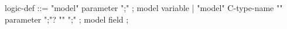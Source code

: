 \begin{syntax}
  logic-def ::=
   {"model" parameter ";"} ; model variable
  | "model" C-type-name "{" parameter ";"? "}" ";" ; model field ;
\end{syntax}

